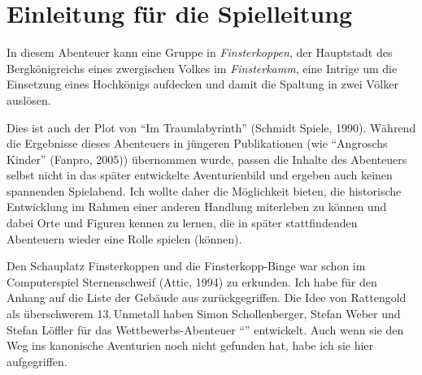 \platz
{}


\lizenz

\hauptteil
\spaltenanfang


\section*{Einleitung für die Spielleitung}
In diesem Abenteuer kann eine Gruppe in \emph{Finsterkoppen},
der Hauptstadt des Bergkönigreichs eines zwergischen Volkes im \emph{Finsterkamm},
eine Intrige um die Einsetzung eines Hochkönigs aufdecken und damit die Spaltung in zwei Völker auslösen.

Dies ist auch der Plot von \enquote{Im Traumlabyrinth} (Schmidt Spiele, 1990).
Während die Ergebnisse dieses Abenteuers in jüngeren Publikationen (wie \enquote{Angroschs Kinder} (Fanpro, 2005))
übernommen wurde, passen die Inhalte des Abenteuers selbst nicht in das später entwickelte Aven\-turien\-bild und ergeben auch keinen spannenden Spielabend.
Ich wollte daher die Möglichkeit bieten, die historische Entwicklung im Rahmen einer anderen Handlung miterleben zu können
und dabei Orte und Figuren kennen zu lernen, die in später stattfindenden Abenteuern wieder eine Rolle spielen (können).

Den Schauplatz Finsterkoppen und die Finsterkopp-Binge war schon im Computerspiel Sternenschweif (Attic, 1994) zu erkunden. %
Ich habe für den Anhang auf die Liste der Gebäude aus  zurückgegriffen.
Die Idee von Rattengold als überschwerem 13.\,Unmetall haben Simon Schollenberger, Stefan Weber und Stefan Löffler für das Wettbewerbs-Abenteuer \enquote{} entwickelt. Auch wenn sie den Weg ins kanonische Aventurien noch nicht gefunden hat, habe ich sie hier aufgegriffen.


